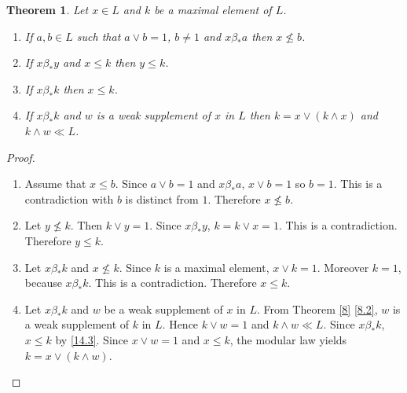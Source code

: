 \documentclass[11pt,reqno]{amsart} %
\theoremstyle{plain}
\newtheorem{theorem}{Theorem}
\theoremstyle{definition}
\theoremstyle{remark}
\numberwithin{equation}{section}
\begin{document}
\begin{theorem}\label{14}
  Let $ x \in L $ and $ k $ be a maximal element of $ L $.
  \begin{enumerate}[label=\textnormal{(\arabic*)}]
    \item
      If $ a, b \in L $ such that $ a \vee b = 1 $, $ b \neq 1 $ and $ x \beta_* a $ then $ x \not\leq b $. \label{14.1}
    \item
      If $ x \beta_*y $ and $ x \leq k $ then $ y \leq k $. \label{14.2}
    \item
      If $ x \beta_* k $ then $ x \leq k $. \label{14.3}
    \item
      If $ x \beta_* k $ and $ w $ is a weak supplement of $ x $ in $ L $ then $ k = x \vee ( k \wedge x ) $ 
      and  $ k \wedge w \ll L $. \label{14.4}
  \end{enumerate}
\end{theorem}

\begin{proof}
  \begin{enumerate}
    \item
      Assume that $ x \leq b $. Since $ a \vee b = 1 $ and $ x \beta_* a $, $ x \vee b = 1 $ so $ b = 1 $. 
      This is a contradiction with $ b $ is distinct from $ 1 $. 
      Therefore $ x \not\le b $.
    \item
      Let $ y \not\le k $. Then $ k \vee y = 1 $. Since $ x \beta_* y $, $ k = k \vee x = 1 $. This is a contradiction. 
      Therefore $ y \leq k $.
    \item
      Let $ x \beta_* k $ and $ x \not\le k $. Since $ k $ is a maximal element, $ x \vee k = 1 $. Moreover $ k = 1 $, 
      because $ x \beta_* k $. This is a contradiction. Therefore $ x \leq k $.
    \item
      Let $ x \beta_* k $ and $ w $ be a weak supplement of $ x $ in $ L $. From Theorem \ref{8} \ref{8.2}, 
      $ w $ is a weak supplement of $ k $ in $ L $. Hence $ k \vee w = 1 $ and $ k \wedge w \ll L $. 
      Since $ x \beta_* k $, $ x \leq k $ by \ref{14.3}. Since $ x \vee w = 1 $ 
      and $ x \leq k $, the modular law yields $ k = x \vee ( k \wedge w ) $.
  \end{enumerate}
\end{proof}

\end{document}

